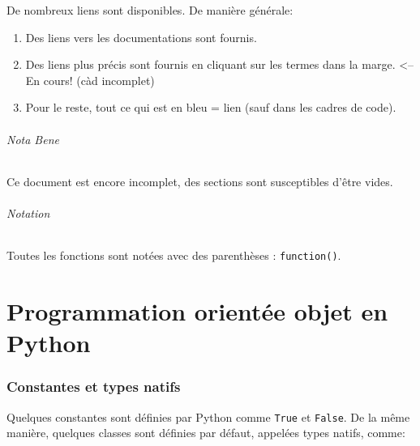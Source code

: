 \documentclass[a4paper, 10pt]{article}
\begin{document}
De nombreux liens sont disponibles. De manière générale:
\begin{enumerate}
    \item Des liens vers les documentations sont fournis.
    \item Des liens plus précis sont fournis en cliquant sur les termes dans la marge. <-- En cours! (càd incomplet)
    \item Pour le reste, tout ce qui est en bleu = lien (sauf dans les cadres de code).
\end{enumerate}

\paragraph{Nota Bene} Ce document est encore incomplet, des sections sont susceptibles d'être vides.

\paragraph{Notation} Toutes les fonctions sont notées avec des parenthèses : \texttt{function()}.

\newpage
\part{Programmation orientée objet en Python}

\section{Constantes et types natifs}
 Quelques constantes sont définies par Python comme \texttt{True} et \texttt{False}. De la même manière, quelques classes sont définies par défaut, appelées types natifs, comme:
\end{document}
